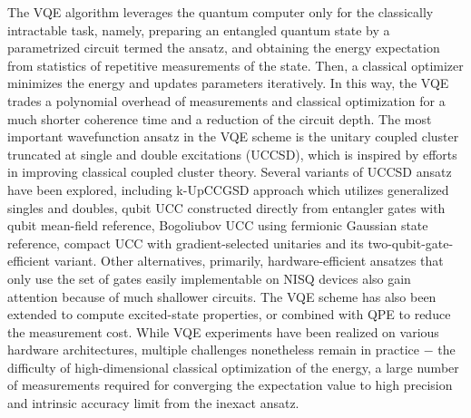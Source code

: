 \documentclass[journal=jctcce,manuscript=article]{achemso}
\begin{document}
The VQE algorithm leverages the quantum computer only for the classically intractable task, namely, preparing an entangled quantum state by a parametrized circuit termed the ansatz, and obtaining the energy expectation from statistics of repetitive measurements of the state.\cite{McClean:2015bs}
Then, a classical optimizer minimizes the energy and updates parameters iteratively. In this way, the VQE trades a polynomial overhead of measurements and classical optimization for a much shorter coherence time and a reduction of the circuit depth.\cite{McArdle:2019we}
The most important wavefunction ansatz in the VQE scheme is the unitary coupled cluster truncated at single and double excitations (UCCSD),\cite{McClean:2015bs, OMalley:2016dc, Barkoutsos:2018hm, Romero:2019hk} which is inspired by efforts in improving classical coupled cluster theory.\cite{bartlett1989alternative, kutzelnigg1991error, Szalay:1995vu, Taube:2006bi, Cooper:2010ck, Evangelista:2011eh, Harsha:2018dv}
Several variants of UCCSD ansatz have been explored, including k-UpCCGSD approach which utilizes generalized singles and doubles,\cite{Lee:2018cy} qubit UCC constructed directly from entangler gates\cite{Ryabinkin:2018jw} with qubit mean-field reference,\cite{Ryabinkin:2018tv} Bogoliubov UCC using fermionic Gaussian state reference,\cite{DallaireDemers:2019iw} compact UCC with gradient-selected unitaries\cite{Grimsley:2019ed} and its two-qubit-gate-efficient variant\cite{Tang:2019ug}.
Other alternatives, primarily, hardware-efficient ansatzes that only use the set of gates easily implementable on NISQ devices\cite{Kandala:2017gh, M:2019hw, Rattew:2019wv} also gain attention because of much shallower circuits.
The VQE scheme has also been extended to compute excited-state properties,\cite{McClean:2017ct, Higgott:2018fca, Colless:2018hp, Parrish:2019bw, Nakanishi:2019wo, Jouzdani:2019tp, GreeneDiniz:2019tg, Tilly:2020tj} or combined with QPE to reduce the measurement cost.\cite{Wang:2019ha, Santagati:2018ih}
While VQE experiments have been realized on various hardware architectures,\cite{Peruzzo:2014kc, Yung:2014iv,OMalley:2016dc, Hempel:2018to,Colless:2018hp, Santagati:2018ih, Shen:2017cc, M:2019hw} multiple challenges nonetheless remain in practice $-$ the difficulty of high-dimensional classical optimization of the energy,\cite{McClean:2018kf} a large number of measurements required for converging the expectation value to high precision\cite{Barkoutsos:2019wq} and intrinsic accuracy limit from the inexact ansatz.\cite{Evangelista:2019kz}
\end{document}
